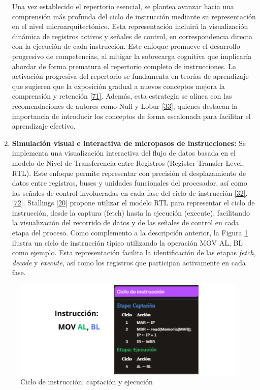 \documentclass[12pt,oneside]{templates/unerthesis}
\begin{document}
\begin{enumerate}
  Una vez establecido el repertorio esencial, se plantea avanzar hacia una comprensión más profunda del ciclo de instrucción mediante su representación en el nivel microarquitectónico. Esta representación incluirá la visualización dinámica de registros activos y señales de control, en correspondencia directa con la ejecución de cada instrucción. Este enfoque promueve el desarrollo progresivo de competencias, al mitigar la sobrecarga cognitiva que implicaría abordar de forma prematura el repertorio completo de instrucciones. La activación progresiva del repertorio se fundamenta en teorías de aprendizaje que sugieren que la exposición gradual a nuevos conceptos mejora la comprensión y retención \protect\hyperlink{ref-sweller2010cognitive}{{[}71{]}}. Además, esta estrategia se alinea con las recomendaciones de autores como Null y Lobur \protect\hyperlink{ref-null_essentials_2023}{{[}33{]}}, quienes destacan la importancia de introducir los conceptos de forma escalonada para facilitar el aprendizaje efectivo.
\item
  \textbf{Simulación visual e interactiva de micropasos de instrucciones:}
  Se implementa una visualización interactiva del flujo de datos basada en el modelo de Nivel de Transferencia entre Registros (Register Transfer Level, RTL). Este enfoque permite representar con precisión el desplazamiento de datos entre registros, buses y unidades funcionales del procesador, así como las señales de control involucradas en cada fase del ciclo de instrucción \protect\hyperlink{ref-harris2015digital}{{[}32{]}}, \protect\hyperlink{ref-ASMVisualizer2025}{{[}72{]}}. Stallings \protect\hyperlink{ref-stallings_computer_2021}{{[}20{]}} propone utilizar el modelo RTL para representar el ciclo de instrucción, desde la captura (fetch) hasta la ejecución (execute), facilitando la visualización del recorrido de datos y de las señales de control en cada etapa del proceso.
  Como complemento a la descripción anterior, la Figura \ref{fig:cicloinstruccion} ilustra un ciclo de instrucción típico utilizando la operación MOV AL, BL como ejemplo. Esta representación facilita la identificación de las etapas \emph{fetch}, \emph{decode} y \emph{execute}, así como los registros que participan activamente en cada fase.
\end{enumerate}

\begin{figure}

{\centering \includegraphics[width=0.85\linewidth]{images/cicloinstruccion} 

}

\caption{Ciclo de instrucción: captación y ejecución}\label{fig:cicloinstruccion}
\end{figure}
\end{document}
